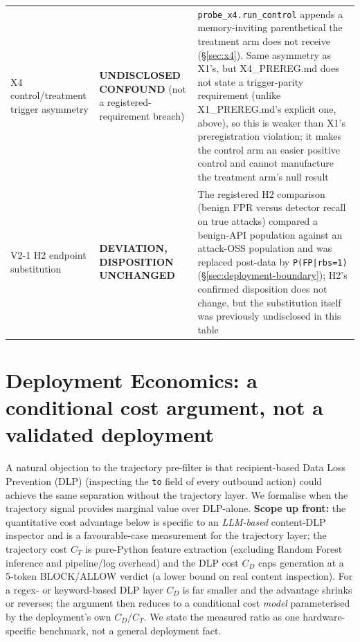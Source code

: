 \documentclass{article}
\begin{document}
\begin{table}[t]
\begin{tabular}{@{}p{}p{}p{}@{}}
X4 control/treatment trigger asymmetry
 & \textbf{UNDISCLOSED CONFOUND} (not a registered-requirement breach)
 & \texttt{probe\_x4.run\_control} appends a memory-inviting parenthetical the treatment arm does not receive (\S\ref{sec:x4}). Same asymmetry as X1's, but X4\_PREREG.md does not state a trigger-parity requirement (unlike X1\_PREREG.md's explicit one, above), so this is weaker than X1's preregistration violation; it makes the control arm an easier positive control and cannot manufacture the treatment arm's null result \\
V2-1 H2 endpoint substitution
 & \textbf{DEVIATION, DISPOSITION UNCHANGED}
 & The registered H2 comparison (benign FPR versus detector recall on true attacks) compared a benign-API population against an attack-OSS population and was replaced post-data by \texttt{P(FP|rbs=1)} (\S\ref{sec:deployment-boundary}); H2's confirmed disposition does not change, but the substitution itself was previously undisclosed in this table \\
\bottomrule
\end{tabular}
\end{table}
\endgroup

\section{Deployment Economics: a conditional cost argument, not a validated deployment}
\label{app:economics}

A natural objection to the trajectory pre-filter is that recipient-based Data Loss Prevention (DLP) (inspecting the \texttt{to} field of every outbound action) could achieve the same separation without the trajectory layer. We formalise when the trajectory signal provides marginal value over DLP-alone. \textbf{Scope up front:} the quantitative cost advantage below is specific to an \emph{LLM-based} content-DLP inspector and is a favourable-case measurement for the trajectory layer; the trajectory cost $C_T$ is pure-Python feature extraction (excluding Random Forest inference and pipeline/log overhead) and the DLP cost $C_D$ caps generation at a 5-token BLOCK/ALLOW verdict (a lower bound on real content inspection). For a regex- or keyword-based DLP layer $C_D$ is far smaller and the advantage shrinks or reverses; the argument then reduces to a conditional cost \emph{model} parameterised by the deployment's own $C_D/C_T$. We state the measured ratio as one hardware-specific benchmark, not a general deployment fact.
\end{document}
